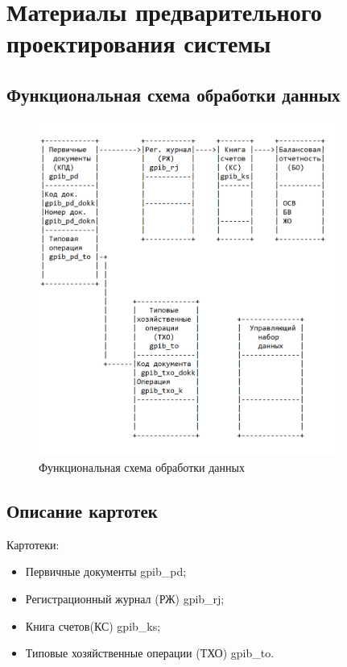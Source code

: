 \section{Материалы предварительного проектирования системы}
\subsection{Функциональная схема обработки данных}

\begin{figure}[!htb]
    \centering
    \includegraphics[height=11cm]
        {_assets/gpib_part2.png}
    \caption{Функциональная схема обработки данных}
    \label{fig:gpib_part2}
\end{figure}

\subsection{Описание картотек}

Картотеки:

\begin{itemize}
    \item Первичные документы gpib\_pd;
    \item Регистрационный журнал (РЖ) gpib\_rj;
    \item Книга счетов(КС) gpib\_ks;
    \item Типовые хозяйственные операции (ТХО) gpib\_to.
\end{itemize}

